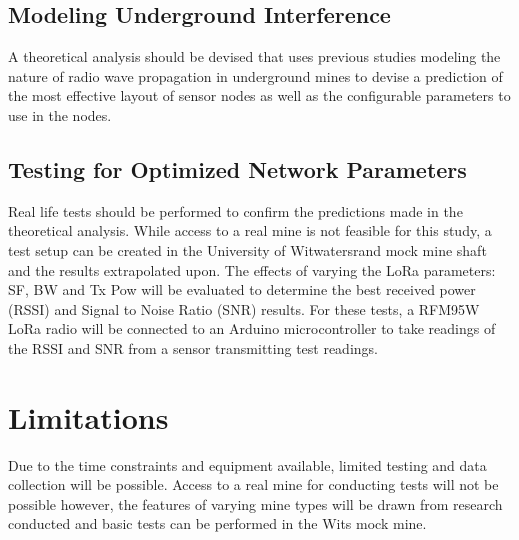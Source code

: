 \documentclass[a4paper,twoside,12pt]{report}
\begin{document}
\subsection{Modeling Underground Interference}
A theoretical analysis should be devised that uses previous studies modeling the nature of radio wave propagation in underground mines to devise a prediction of the most effective layout of sensor nodes as well as the configurable parameters to use in the nodes.

\subsection{Testing for Optimized Network Parameters}
Real life tests should be performed to confirm the predictions made in the theoretical analysis. While access to a real mine is not feasible for this study, a test setup can be created in the University of Witwatersrand mock mine shaft and the results extrapolated upon. The effects of varying the LoRa parameters: SF, BW and Tx Pow will be evaluated to determine the best received power (RSSI) and Signal to Noise Ratio (SNR) results.
\newline
For these tests, a RFM95W LoRa radio will be connected to an Arduino microcontroller to take readings of the RSSI and SNR from a sensor transmitting test readings.


\section{Limitations}
Due to the time constraints and equipment available, limited testing and data collection will be possible.
Access to a real mine for conducting tests will not be possible however, the features of varying mine types will be drawn from research conducted and basic tests can be performed in the Wits mock mine.
\end{document}
